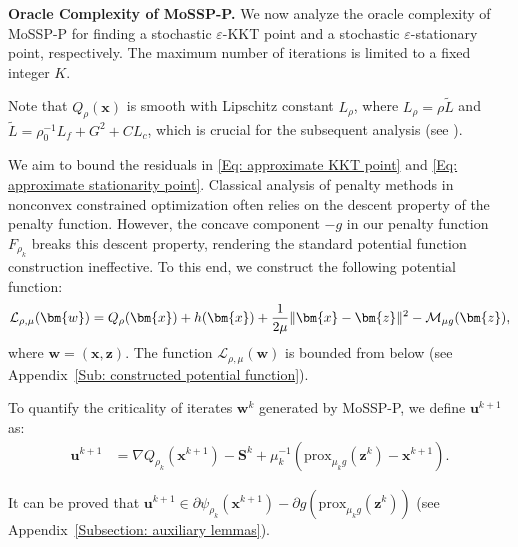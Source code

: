 \documentclass{article}
\theoremstyle{plain}
\theoremstyle{definition}
\theoremstyle{remark}
\newcommand{\prox}{\mathrm{prox}}
\newcommand{\bx}{\bm{x}}
\newcommand{\bu}{\bm{u}}
\newcommand{\bz}{\bm{z}}
\newcommand{\calL}{\mathcal{L}}
\newcommand{\calM}{\mathcal{M}}
\newcommand{\bw}{\bm{w}}
\newcommand{\bS}{\bm{S}}
\numberwithin{equation}{section}
\begin{document}
\noindent\textbf{Oracle Complexity of MoSSP-P.}\; We now analyze the oracle complexity of
MoSSP-P for finding a stochastic \(\varepsilon\)-KKT point and a stochastic \(\varepsilon\)-stationary point, respectively. The maximum number of iterations is limited to a fixed integer \(K\).

Note that \(Q_{\rho}(\bx)\) is smooth with Lipschitz constant \(L_\rho\), where $L_{\rho}= \rho \tilde{L}$ and $\tilde{L}= {\rho_0^{-1}L_f}+ G^2 + CL_c$, which is crucial for the subsequent analysis (see ).

We aim to bound the residuals in \eqref{Eq: approximate KKT point} and \eqref{Eq: approximate stationarity point}. Classical analysis of penalty methods in nonconvex constrained optimization often relies on the descent property of the penalty function. However, the concave component $-g$ in our penalty function \(F_{\rho_k}\) breaks this descent property, rendering the standard potential function construction ineffective. To this end, we construct the following potential function:
\begin{align}
    \calL_{\rho, \mu}(\bw) = Q_{\rho}(\bx) + h(\bx) + \frac{1}{2\mu}\|\bx - \bz\|^{2} - \calM_{\mu g}(\bz),\notag
\end{align}
where $\bw = (\bx,\bz)$. The function $\calL_{\rho, \mu}(\bw)$ is bounded from below (see Appendix~\ref{Sub: constructed potential function}).

To quantify the criticality of iterates \(\bw^k\) generated by MoSSP-P, we define \(\bu^{k+1}\) as:
{
\begin{equation}
\label{Eq: u-define-stochastic-polyak}
\begin{aligned}
\bu^{k+1}
&= \nabla Q_{\rho_k}(\bx^{k+1}) - {\bS^k} + \mu_k^{-1}(\prox_{\mu_k g}(\bz^k)- \bx^{k+1}).
\end{aligned}
\end{equation}}

It can be proved that \(\bu^{k+1}\in \partial \psi_{\rho_k}(\bx^{k+1}) - \partial g(\prox_{\mu_k g}(\bz^k))\) (see Appendix~\ref{Subsection: auxiliary lemmas}).
\end{document}
